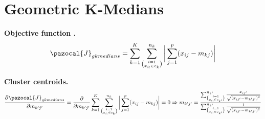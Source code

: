 \documentclass[12pt]{article}
\renewcommand\cite{\citep}  %
\newcommand{\CJ}{\pazocal{J}}
\begin{document}
\cleardoublepage	
	

\section{Geometric K-Medians}

\noindent \textbf{Objective function \cite{whelan2015understanding}.}
\begin{align}\label{kmed2}
\CJ_{gkmedians} = \sum_{k=1}^{K}\sum_{\binom{i=1}{x_{i:} \in c_k}}^{n_k} \bigg{|}\sum_{j=1}^{p}(x_{ij}-m_{kj})\bigg{|}
\end{align}	

\noindent \textbf{Cluster centroids.}	
\begin{align}\label{kmed2obj}
\frac{\partial \CJ_{gkmedians}}{\partial m_{k'j'}} = \frac{\partial}{\partial m_{k'j'}} \sum_{k=1}^{K}\sum_{\binom{i=1}{x_{i:} \in c_k}}^{n_k} \bigg{|}\sum_{j=1}^{p}(x_{ij}-m_{kj})\bigg{|} = 0 
\Rightarrow
m_{k'j'} = \frac{\sum_{\binom{i=1}{x_{i:} \in c_{k'}}}^{n_{k'}} \frac{x_{ij'}}{\sqrt{(x_{ij'}-m_{k'j'})^2}}}{\sum_{\binom{i=1}{x_{i:} \in c_{k'}}}^{n_{k'}}\frac{1}{\sqrt{(x_{ij'}-m_{k'j'})^2}}}
\end{align}	
	
\end{document}
